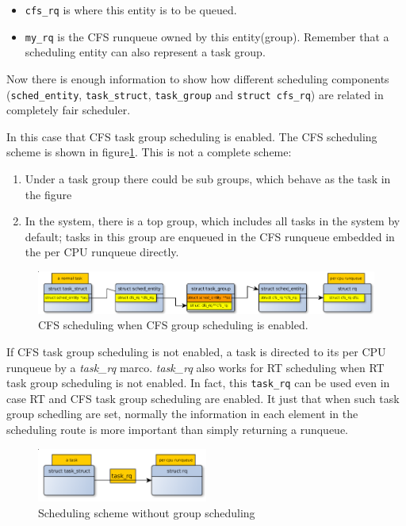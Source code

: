 \begin{itemize}
\item \texttt{cfs\_rq} is where this entity is to be queued.
		
\item \texttt{my\_rq} is the CFS runqueue owned by this entity(group).
	Remember that a scheduling entity can also represent a task group.
\end{itemize}
Now there is enough information to show how different scheduling components
(\texttt{sched\_entity}, \texttt{task\_struct}, \texttt{task\_group}
and \texttt{struct cfs\_rq}) are related in completely fair scheduler.

In this case that CFS task group scheduling is enabled. The CFS
scheduling scheme is shown in figure\ref{fig:cfs_scheme_tg}.  This is
not a complete scheme: 

\begin{enumerate}
\item Under a task group there could be sub groups, which behave as
  the task in the figure 
\item In the system, there is a top group, which includes all tasks in
  the system by default; tasks in this group are enqueued in the CFS
  runqueue embedded in the per CPU runqueue directly.
\end{enumerate}
\begin{figure}[htbp]
        \centering
        \includegraphics[width=\textwidth]{images/cfs_scheduling_scheme_tg}
        \caption{CFS scheduling when CFS group scheduling is enabled.}
        \label{fig:cfs_scheme_tg}
\end{figure}

If CFS task group scheduling is not enabled, a task is directed to its
per CPU runqueue by a \emph{task\_rq} marco. \emph{task\_rq} also
works for RT scheduling when RT task group scheduling is not enabled.
In fact, this \texttt{task\_rq} can be used even in case RT and CFS
task group scheduling are enabled. It just that when such task group
schedling are set, normally the information in each element in the
scheduling route is more important than simply returning a runqueue.
\begin{figure}[htbp]
        \centering
        \includegraphics[height=0.1\textheight,width=0.5\textwidth]{images/scheduling_scheme_no_tg}
        \caption{Scheduling scheme without group scheduling}
        \label{fig:cfs_scheme_no_tg}
\end{figure}

